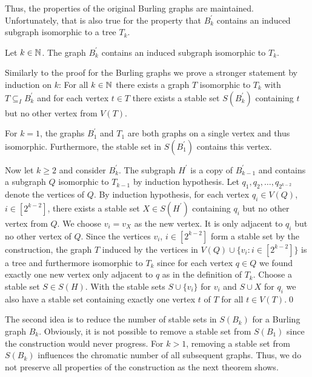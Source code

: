 Thus, the properties of the original Burling graphs are maintained. Unfortunately, that is also true for the property that $B_k^\prime$ contains an induced subgraph isomorphic to a tree $T_k$.

\begin{thm}
Let $k\in\mathbb{N}$. The graph $B_k^\prime$ contains an induced subgraph isomorphic to $T_k$.
\end{thm}
\begin{prf}
Similarly to the proof for the Burling graphs we prove a stronger statement by induction on $k$: For all $k\in\mathbb{N}$ there exists a graph $T$ isomorphic to $T_k$ with $T\subseteq_I B_k^\prime$ and for each vertex $t\in T$ there exists a stable set $S(B_k^\prime )$ containing $t$ but no other vertex from $V(T)$.

For $k=1$, the graphs $B_1^\prime$ and $T_1$ are both graphs on a single vertex and thus isomorphic. Furthermore, the stable set in $S(B_1^\prime)$ contains this vertex.

Now let $k\geq 2$ and consider $B_k^\prime$. The subgraph $H^\prime$ is a copy of $B_{k-1}^\prime$ and contains a subgraph $Q$ isomorphic to $T_{k-1}$ by induction hypothesis.  Let $q_1, q_2,\dots , q_{2^{k-2}}$ denote the vertices of $Q$. By induction hypothesis, for each vertex $q_i\in V(Q)$, $i\in [2^{k-2}]$, there exists a stable set $X\in S(H^\prime)$ containing $q_i$ but no other vertex from $Q$. We choose $v_i=v_X$ as the new vertex. It is only adjacent to $q_i$ but no other vertex of $Q$. Since the vertices $v_i$, $i\in [2^{k-2}]$ form a stable set by the construction, the graph $T$ induced by the vertices in $V(Q)\cup \{v_i:i\in [2^{k-2}]\}$ is a tree and furthermore isomorphic to $T_k$ since for each vertex $q\in Q$ we found exactly one new vertex only adjacent to $q$ as in the definition of $T_k$. Choose a stable set $S\in S(H)$. With the stable sets $S\cup \{v_i\}$ for $v_i$ and $S\cup X$ for $q_i$ we also have a stable set containing exactly one vertex $t$ of $T$ for all $t\in V(T)$.\qed
\end{prf}

The second idea is to reduce the number of stable sets in $S(B_k)$ for a Burling graph $B_k$. Obviously, it is not possible to remove a stable set from $S(B_1)$ since the construction would never progress. For $k>1$, removing a stable set from $S(B_k)$ influences the chromatic number of all subsequent graphs. Thus, we do not preserve all properties of the construction as the next theorem shows.

